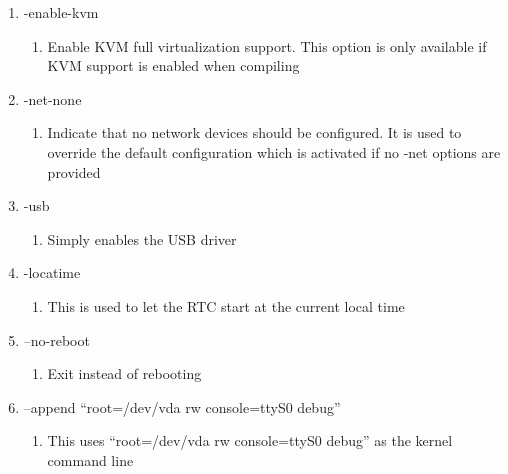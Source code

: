 \documentclass[journal,10pt,onecolumn,compsoc]{IEEEtran} \usepackage[margin=1.0in]{geometry} \usepackage{pdfpages}
\begin{document}
\begin{enumerate}
\item -enable-kvm
	\begin{enumerate}[label=(\Alph*)]
		\item Enable KVM full virtualization support. This option is only available if KVM support is enabled when compiling
	\end{enumerate}

\item -net-none
	\begin{enumerate}[label=(\Alph*)]
		\item Indicate that no network devices should be configured. It is used to override the default configuration which is activated if no -net options are provided
	\end{enumerate}

\item -usb
	\begin{enumerate}[label=(\Alph*)]
		\item Simply enables the USB driver
	\end{enumerate}

\item -locatime
	\begin{enumerate}[label=(\Alph*)]
		\item This is used to let the RTC start at the current local time
	\end{enumerate}

\item --no-reboot
	\begin{enumerate}[label=(\Alph*)]
	\item Exit instead of rebooting
	\end{enumerate}

\item --append “root=/dev/vda rw console=ttyS0 debug”
	\begin{enumerate}[label=(\Alph*)]
	\item This uses “root=/dev/vda rw console=ttyS0 debug” as the kernel command line
	\end{enumerate}

\end{enumerate}
\end{document}
